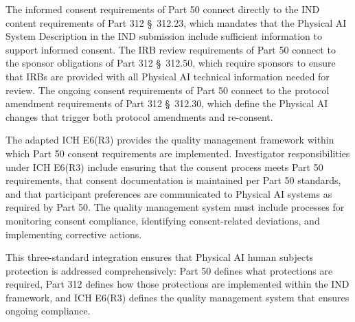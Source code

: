 The informed consent requirements of Part 50 connect directly to the IND
content requirements of Part 312 \S~312.23, which mandates that the Physical
AI System Description in the IND submission include sufficient information to
support informed consent. The IRB review requirements of Part 50 connect to the
sponsor obligations of Part 312 \S~312.50, which require sponsors to ensure
that IRBs are provided with all Physical AI technical information needed for
review. The ongoing consent requirements of Part 50 connect to the protocol
amendment requirements of Part 312 \S~312.30, which define the Physical AI
changes that trigger both protocol amendments and re-consent.

The adapted ICH E6(R3) \cite{ich-adapt} provides the quality management
framework within which Part 50 consent requirements are implemented.
Investigator responsibilities under ICH E6(R3) include ensuring that the
consent process meets Part 50 requirements, that consent documentation is
maintained per Part 50 standards, and that participant preferences are
communicated to Physical AI systems as required by Part 50. The quality
management system must include processes for monitoring consent compliance,
identifying consent-related deviations, and implementing corrective actions.

This three-standard integration ensures that Physical AI human subjects
protection is addressed comprehensively: Part 50 defines what protections are
required, Part 312 defines how those protections are implemented within the IND
framework, and ICH E6(R3) defines the quality management system that ensures
ongoing compliance. 

